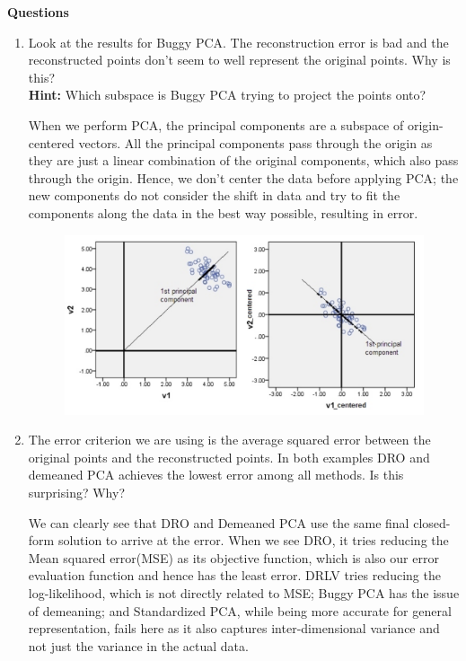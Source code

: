     \textbf{Questions}
    \begin{enumerate}
        \item Look at the results for Buggy PCA. The reconstruction error is bad and the
        reconstructed points don't seem to well represent the original points. Why is
        this? \\
        \textbf{Hint: } Which subspace is Buggy PCA trying to project the points
        onto?
        
        \begin{soln}
            When we perform PCA, the principal components are a subspace of origin-centered vectors. All the principal components pass through the origin as they are just a linear combination of the original components, which also pass through the origin. Hence, we don't center the data before applying PCA; the new components do not consider the shift in data and try to fit the components along the data in the best way possible, resulting in error. \cite{22329}
            \begin{figure}[H]
                \centering
                \includegraphics[scale=0.5]{Images/q24/q24_q1_ref.png}
            \end{figure}
        \end{soln}
        \item The error criterion we are using is the average squared error 
        between the original points and the reconstructed points.
        In both examples DRO and demeaned PCA achieves the lowest error among all
        methods. 
        Is this surprising? Why?
        
        \begin{soln}
            We can clearly see that DRO and Demeaned PCA use the same final closed-form solution to arrive at the error. When we see DRO, it tries reducing the Mean squared error(MSE) as its objective function, which is also our error evaluation function and hence has the least error. DRLV tries reducing the log-likelihood, which is not directly related to MSE; Buggy PCA has the issue of demeaning; and Standardized PCA, while being more accurate for general representation, fails here as it also captures inter-dimensional variance and not just the variance in the actual data.
        \end{soln}
    \end{enumerate}

